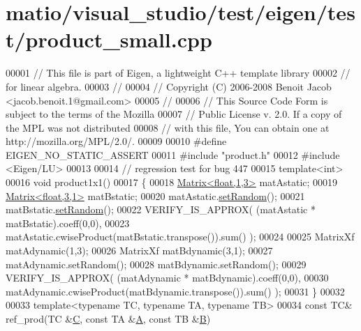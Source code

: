 \hypertarget{matio_2visual__studio_2test_2eigen_2test_2product__small_8cpp_source}{}\section{matio/visual\+\_\+studio/test/eigen/test/product\+\_\+small.cpp}
\label{matio_2visual__studio_2test_2eigen_2test_2product__small_8cpp_source}

\begin{DoxyCode}
00001 \textcolor{comment}{// This file is part of Eigen, a lightweight C++ template library}
00002 \textcolor{comment}{// for linear algebra.}
00003 \textcolor{comment}{//}
00004 \textcolor{comment}{// Copyright (C) 2006-2008 Benoit Jacob <jacob.benoit.1@gmail.com>}
00005 \textcolor{comment}{//}
00006 \textcolor{comment}{// This Source Code Form is subject to the terms of the Mozilla}
00007 \textcolor{comment}{// Public License v. 2.0. If a copy of the MPL was not distributed}
00008 \textcolor{comment}{// with this file, You can obtain one at http://mozilla.org/MPL/2.0/.}
00009 
00010 \textcolor{preprocessor}{#define EIGEN\_NO\_STATIC\_ASSERT}
00011 \textcolor{preprocessor}{#include "product.h"}
00012 \textcolor{preprocessor}{#include <Eigen/LU>}
00013 
00014 \textcolor{comment}{// regression test for bug 447}
00015 \textcolor{keyword}{template}<\textcolor{keywordtype}{int}>
00016 \textcolor{keywordtype}{void} product1x1()
00017 \{
00018   \hyperlink{group___core___module_class_eigen_1_1_matrix}{Matrix<float,1,3>} matAstatic;
00019   \hyperlink{group___core___module_class_eigen_1_1_matrix}{Matrix<float,3,1>} matBstatic;
00020   matAstatic.\hyperlink{class_eigen_1_1_plain_object_base_af0e576a0e1aefc9ee346de44cc352ba3}{setRandom}();
00021   matBstatic.\hyperlink{class_eigen_1_1_plain_object_base_af0e576a0e1aefc9ee346de44cc352ba3}{setRandom}();
00022   VERIFY\_IS\_APPROX( (matAstatic * matBstatic).coeff(0,0), 
00023                     matAstatic.cwiseProduct(matBstatic.transpose()).sum() );
00024 
00025   MatrixXf matAdynamic(1,3);
00026   MatrixXf matBdynamic(3,1);
00027   matAdynamic.setRandom();
00028   matBdynamic.setRandom();
00029   VERIFY\_IS\_APPROX( (matAdynamic * matBdynamic).coeff(0,0), 
00030                     matAdynamic.cwiseProduct(matBdynamic.transpose()).sum() );
00031 \}
00032 
00033 \textcolor{keyword}{template}<\textcolor{keyword}{typename} TC, \textcolor{keyword}{typename} TA, \textcolor{keyword}{typename} TB>
00034 \textcolor{keyword}{const} TC& ref\_prod(TC &\hyperlink{group___core___module}{C}, \textcolor{keyword}{const} TA &\hyperlink{group___core___module_class_eigen_1_1_matrix}{A}, \textcolor{keyword}{const} TB &\hyperlink{group___core___module_class_eigen_1_1_matrix}{B})

\end{DoxyCode}
